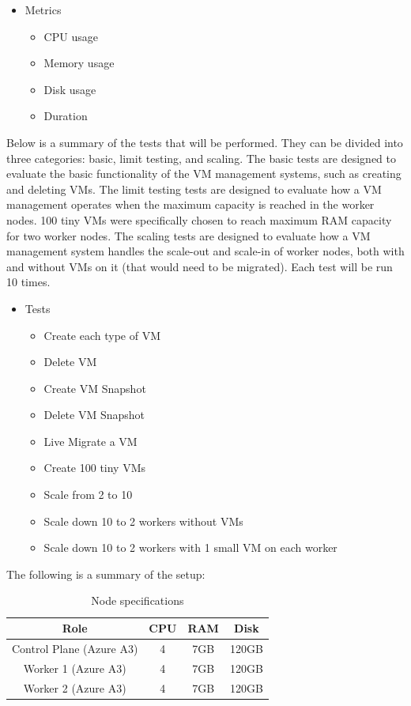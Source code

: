 \documentclass{article}
\begin{document}
\begin{itemize}
    \item Metrics
    \begin{itemize}
        \item CPU usage
        \item Memory usage
        \item Disk usage
        \item Duration
    \end{itemize}
\end{itemize}

\noindent Below is a summary of the tests that will be performed. They can be divided into three categories: basic, limit testing, and scaling. The basic tests are designed to evaluate the basic functionality of the VM management systems, such as creating and deleting VMs. The limit testing tests are designed to evaluate how a VM management operates when the maximum capacity is reached in the worker nodes. 100 tiny VMs were specifically chosen to reach maximum RAM capacity for two worker nodes. The scaling tests are designed to evaluate how a VM management system handles the scale-out and scale-in of worker nodes, both with and without VMs on it (that would need to be migrated). Each test will be run 10 times. 

\begin{itemize}
    \item Tests
    \begin{itemize}
        \item Create each type of VM
        \item Delete VM
        \item Create VM Snapshot
        \item Delete VM Snapshot
        \item Live Migrate a VM
        \item Create 100 tiny VMs
        \item Scale from 2 to 10
        \item Scale down 10 to 2 workers without VMs
        \item Scale down 10 to 2 workers with 1 small VM on each worker
    \end{itemize}
\end{itemize}

\noindent The following is a summary of the setup:
\begin{table}[!ht]
    \centering
    \begin{tabular}{ |c|c|c|c| }
        \hline
        Role & CPU & RAM & Disk\\
        \hline
        Control Plane (Azure A3) & 4 & 7GB & 120GB  \\
        Worker 1 (Azure A3) & 4 & 7GB & 120GB  \\
        Worker 2 (Azure A3) & 4 & 7GB & 120GB  \\
        \hline
    \end{tabular}
    \caption{Node specifications}
\end{table}
\end{document}
